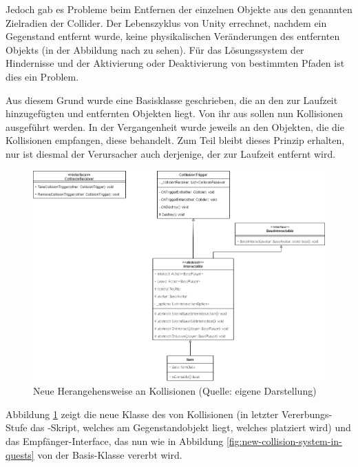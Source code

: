 Jedoch gab es Probleme beim Entfernen der einzelnen Objekte aus den genannten Zielradien der Collider. Der Lebenszyklus von Unity errechnet, nachdem ein Gegenstand entfernt wurde, keine physikalischen Veränderungen des entfernten Objekts (in der Abbildung nach  zu sehen). Für das Lösungssystem der Hindernisse und der Aktivierung oder Deaktivierung von bestimmten Pfaden ist dies ein Problem.

Aus diesem Grund wurde eine Basisklasse geschrieben, die an den zur Laufzeit hinzugefügten und entfernten Objekten liegt. Von ihr aus sollen nun Kollisionen ausgeführt werden. In der Vergangenheit wurde jeweils an den Objekten, die die Kollisionen empfangen, diese behandelt. Zum Teil bleibt dieses Prinzip erhalten, nur ist diesmal der Verursacher auch derjenige, der zur Laufzeit entfernt wird.

\begin{figure}[ht]
\centering
\includegraphics[width=1\linewidth]{content/pictures/CollisionSystem.drawio.png}
\caption{Neue Herangehensweise an Kollisionen (Quelle: eigene Darstellung)}
\label{fig:new-collision-system}
\end{figure}

Abbildung \ref{fig:new-collision-system} zeigt die neue Klasse des  von Kollisionen (in letzter Vererbungs-Stufe das -Skript, welches am Gegenstandobjekt liegt, welches platziert wird) und das Empfänger-Interface, das nun wie in Abbildung \ref{fig:new-collision-system-in-quests} von der  Basis-Klasse vererbt wird. 


